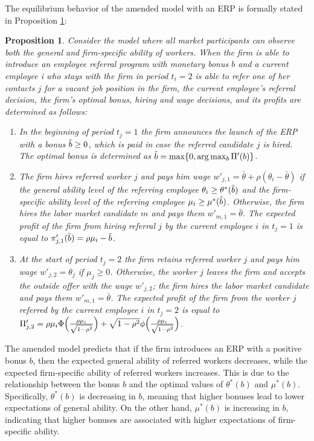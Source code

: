 \documentclass[12pt]{article}
\newtheorem{proposition}{Proposition}
\begin{document}
The equilibrium behavior of the amended model with an ERP is formally stated in Proposition \ref{prop:ext_eq_erp}:
\begin{proposition}\label{prop:ext_eq_erp}
    Consider the model where all market participants can observe both the general and firm-specific ability of workers. When the firm is able to introduce an employee referral program with monetary bonus $b$ and a current employee i who stays with the firm in period $t_i = 2$ is able to refer one of her contacts $j$ for a vacant job position in the firm, the current employee’s referral decision, the firm’s optimal bonus, hiring and wage decisions, and its profits are determined as follows:
    \begin{enumerate}[label={\roman*})]
        \item In the beginning of period $t_j = 1$ the firm announces the launch of the ERP with a bonus $\Tilde{b} \geq 0$, which is paid in case the referred candidate $j$ is hired. The optimal bonus is determined as $\Tilde{b}=\max\{0,\arg\max_{b}\Pi'(b)\}$.
		\item The firm hires referred worker $j$ and pays him wage $w'_{j,1} = \bar{\theta}+\rho\left(\theta_i - \bar{\theta}\right)$ if the general ability level of the referring employee $\theta_i \geq \theta^*(\Tilde{b})$ and the firm-specific ability level of the referring employee $\mu_i \geq \mu^*(\Tilde{b})$. Otherwise, the firm hires the labor market candidate $m$ and pays them $w'_{m,1} = \bar{\theta}$. The expected profit of the firm from hiring referral $j$ by the current employee $i$ in $t_j = 1$ is equal to $\pi'_{j,1}(\Tilde{b}) = \rho\mu_i-\Tilde{b}$.
        \item  At the start of period $t_j = 2$ the firm retains referred worker $j$ and pays him wage $w'_{j,2} = \theta_j$ if $\mu_j \geq 0$. Otherwise, the worker $j$ leaves the firm and accepts the outside offer with the wage $w'_{j,2}$; the firm hires the labor market candidate and pays them $w'_{m,1} = \bar{\theta}$. The expected profit of the firm from the worker $j$ referred by the current employee $i$ in $t_j = 2$ is equal to $\Pi'_{j,2} = \rho\mu_i \Phi \Bigl(\frac{\rho\mu_i}{\sqrt{1-\rho^2}} \Bigr) + \sqrt{1-\rho^2}\phi \Bigl(\frac{\rho\mu_i}{\sqrt{1-\rho^2}} \Bigr)$.
	\end{enumerate}
\end{proposition}

The amended model predicts that if the firm introduces an ERP with a positive bonus $b$, then the expected general ability of referred workers decreases, while the expected firm-specific ability of referred workers increases. This is due to the relationship between the bonus $b$ and the optimal values of $\theta^*(b)$ and $\mu^*(b)$. Specifically, $\theta^*(b)$ is decreasing in $b$, meaning that higher bonuses lead to lower expectations of general ability. On the other hand, $\mu^*(b)$ is increasing in $b$, indicating that higher bonuses are associated with higher expectations of firm-specific ability.
\end{document}
